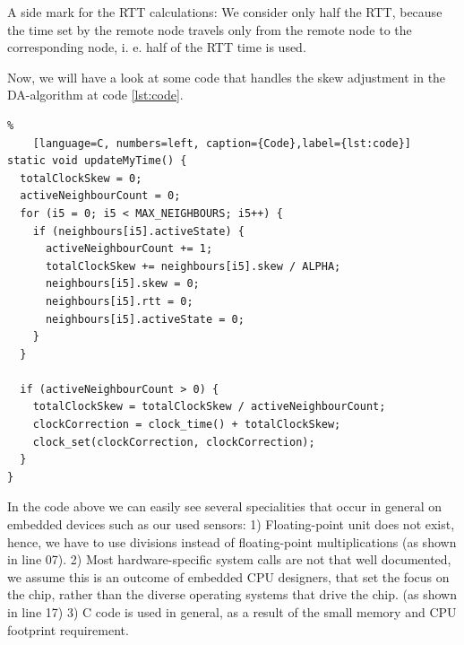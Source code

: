 \documentclass{llncs}
\begin{document}
A side mark for the RTT calculations: We consider only half the RTT, because the time set by the remote node travels only from the remote node to the corresponding node, i. e. half of the RTT time is used.


Now, we will have a look at some code that handles the skew adjustment in the DA-algorithm at code \ref{lst:code}.

\begin{lstlisting}%
	[language=C, numbers=left, caption={Code},label={lst:code}]
static void updateMyTime() {
  totalClockSkew = 0;
  activeNeighbourCount = 0;
  for (i5 = 0; i5 < MAX_NEIGHBOURS; i5++) {
    if (neighbours[i5].activeState) {
      activeNeighbourCount += 1;
      totalClockSkew += neighbours[i5].skew / ALPHA;
      neighbours[i5].skew = 0;
      neighbours[i5].rtt = 0;
      neighbours[i5].activeState = 0;
    }
  }

  if (activeNeighbourCount > 0) {
    totalClockSkew = totalClockSkew / activeNeighbourCount;
    clockCorrection = clock_time() + totalClockSkew;
    clock_set(clockCorrection, clockCorrection);
  }
}
\end{lstlisting}
\noindent In the code above we can easily see several specialities that occur in general on embedded devices such as our used sensors:
1) Floating-point unit does not exist, hence, we have to use divisions instead of floating-point multiplications (as shown in line 07).
2) Most hardware-specific system calls are not that well documented, we assume this is an outcome of embedded CPU designers, that set the focus on the chip, rather than the diverse operating systems that drive the chip. (as shown in line 17)
3) C code is used in general, as a result of the small memory and CPU footprint requirement.
\end{document}
